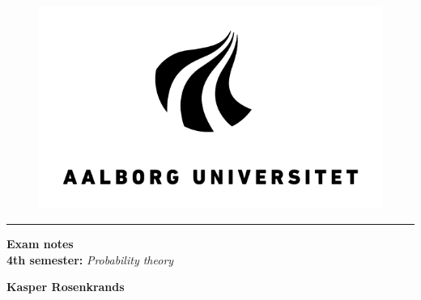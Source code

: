 \begin{center}
\thispagestyle{empty}
\parskip=14pt%
\vspace*{3\parskip}%

\begin{figure}[h]
\centering
    \includegraphics[scale=2]{Figures/AAU_logo/AAU_LOGO_RGB.png}
\end{figure}

\vspace{-8pt}
\rule{16cm}{1pt}
\vspace{5pt}

\Huge{\textbf{Exam notes}}\\
\vspace{8pt}
\Large{\textbf{4th semester:} \textit{Probability theory}}\\
\vspace{50pt}

\Large{\textbf{Kasper Rosenkrands}}
\end{center}

\newpage
